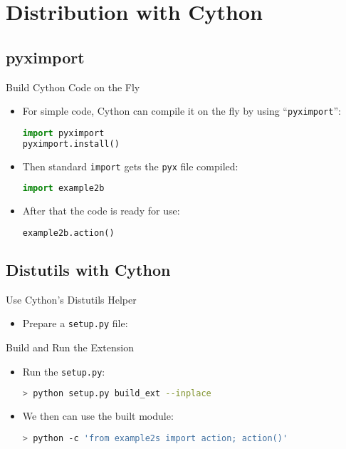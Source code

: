 \documentclass[dvips,xcolor=pst,14pt]{beamer}
\begin{document}
\section{
Distribution with Cython
}

\subsection{
pyximport
}

\begin{frame}[fragile]{
%
Build Cython Code on the Fly
%
}
\begin{itemize}
\item For simple code, Cython can compile it on the fly by using
``{\color{red}\verb+pyximport+}'':
\begin{lstlisting}[language=Python]
import pyximport
pyximport.install()
\end{lstlisting}
\item Then standard \verb+import+ gets the \verb+pyx+ file compiled:
\begin{lstlisting}[language=Python]
import example2b
\end{lstlisting}
\item After that the code is ready for use:
\begin{lstlisting}[language=Python]
example2b.action()
\end{lstlisting}
\end{itemize}
\end{frame}

\subsection{
Distutils with Cython
}

\begin{frame}[fragile]{
%
Use Cython's Distutils Helper
%
}
\begin{itemize}
\item Prepare a \verb+setup.py+ file:

\end{itemize}
\end{frame}

\begin{frame}[fragile]{
%
Build and Run the Extension
%
}
\begin{itemize}
\item Run the \verb+setup.py+:
\begin{lstlisting}[language=bash]
> python setup.py build_ext --inplace
\end{lstlisting}
\item We then can use the built module:
\begin{lstlisting}[language=bash]
> python -c 'from example2s import action; action()'
\end{lstlisting}
\end{itemize}
\end{frame}
\end{document}
